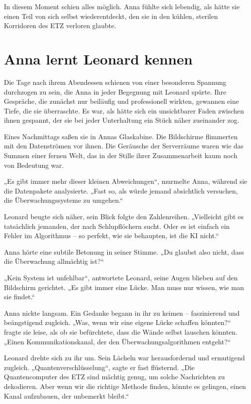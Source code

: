 \documentclass[
]{article}
\begin{document}
In diesem Moment schien alles möglich. Anna fühlte sich lebendig, als hätte sie einen Teil von sich selbst wiederentdeckt, den sie in den kühlen, sterilen Korridoren des ETZ verloren glaubte.

\section{Anna lernt Leonard kennen}\label{anna-lernt-leonard-kennen}

Die Tage nach ihrem Abendessen schienen von einer besonderen Spannung durchzogen zu sein, die Anna in jeder Begegnung mit Leonard spürte. Ihre Gespräche, die zunächst nur beiläufig und professionell wirkten, gewannen eine Tiefe, die sie überraschte. Es war, als hätte sich ein unsichtbarer Faden zwischen ihnen gespannt, der sie bei jeder Unterhaltung ein Stück näher zueinander zog.

Eines Nachmittags saßen sie in Annas Glaskabine. Die Bildschirme flimmerten mit den Datenströmen vor ihnen. Die Geräusche der Serverräume waren wie das Summen einer fernen Welt, das in der Stille ihrer Zusammenarbeit kaum noch von Bedeutung war.

„Es gibt immer mehr dieser kleinen Abweichungen``, murmelte Anna, während sie die Datenpakete analysierte. „Fast so, als würde jemand absichtlich versuchen, die Überwachungssysteme zu umgehen.``

Leonard beugte sich näher, sein Blick folgte den Zahlenreihen. „Vielleicht gibt es tatsächlich jemanden, der nach Schlupflöchern sucht. Oder es ist einfach ein Fehler im Algorithmus -- so perfekt, wie sie behaupten, ist die KI nicht.``

Anna hörte eine subtile Betonung in seiner Stimme. „Du glaubst also nicht, dass die Überwachung allmächtig ist?{\kern0pt}``

„Kein System ist unfehlbar``, antwortete Leonard, seine Augen blieben auf den Bildschirm gerichtet. „Es gibt immer eine Lücke. Man muss nur wissen, wie man sie findet.``

Anna nickte langsam. Ein Gedanke begann in ihr zu keimen -- faszinierend und beängstigend zugleich. „Was, wenn wir eine eigene Lücke schaffen könnten?{\kern0pt}`` fragte sie leise, als ob sie befürchtete, dass die Wände selbst lauschen könnten. „Einen Kommunikationskanal, der den Überwachungsalgorithmen entgeht?{\kern0pt}``

Leonard drehte sich zu ihr um. Sein Lächeln war herausfordernd und ermutigend zugleich. „Quantenverschlüsselung``, sagte er fast flüsternd. „Die Quantencomputer des ETZ sind mächtig genug, um solche Nachrichten zu dekodieren. Aber wenn wir die richtige Methode finden, könnte es gelingen, einen Kanal aufzubauen, der unbemerkt bleibt.``
\end{document}
